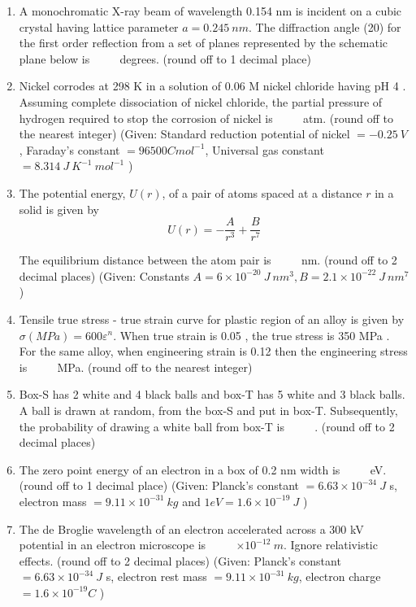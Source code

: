 \documentclass[journal]{IEEEtran}
\begin{document}
\begin{enumerate}
    \item A monochromatic X-ray beam of wavelength 0.154 nm is incident on a cubic crystal having lattice parameter ${a}=0.245 {~nm}$. The diffraction angle (20) for the first order reflection from a set of planes represented by the schematic plane below is $\qquad$ degrees. (round off to 1 decimal place)
    
    \newpage
		

 
    \item Nickel corrodes at 298 K in a solution of 0.06 M nickel chloride having pH 4 . Assuming complete dissociation of nickel chloride, the partial pressure of hydrogen required to stop the corrosion of nickel is $\qquad$ atm. (round off to the nearest integer)
(Given: Standard reduction potential of nickel $=-0.25 {~V}$,
Faraday's constant $=96500 {C} {mol}^{-1}$, Universal gas constant $=8.314 {~J} {~K}^{-1} {~mol}^{-1}$ )
		


    \item The potential energy, ${U}(r)$, of a pair of atoms spaced at a distance $r$ in a solid is given by
$$
{U}(r)=-\frac{A}{r^{3}}+\frac{B}{r^{7}}
$$

The equilibrium distance between the atom pair is $\qquad$ nm.
(round off to 2 decimal places)
(Given: Constants $A=6 \times 10^{-20} {~J} {~nm}^{3}, B=2.1 \times 10^{-22} {~J} {~nm}^{7}$ )

    \item  Tensile true stress - true strain curve for plastic region of an alloy is given by $\sigma({MPa})=600 \varepsilon^{n}$.
When true strain is 0.05 , the true stress is 350 MPa . For the same alloy, when engineering strain is 0.12 then the engineering stress is $\qquad$ MPa. (round off to the nearest integer)


    \item Box-S has 2 white and 4 black balls and box-T has 5 white and 3 black balls. A ball is drawn at random, from the box-S and put in box-T. Subsequently, the probability of drawing a white ball from box-T is $\qquad$ . (round off to 2 decimal places)
    \item The zero point energy of an electron in a box of 0.2 nm width is $\qquad$ eV.
(round off to 1 decimal place)
(Given: Planck's constant $=6.63 \times 10^{-34} {~J}$ s, electron mass $=9.11 \times 10^{-31} {~kg}$ and $1 {eV}=1.6 \times 10^{-19} {~J}$ )

\item The de Broglie wavelength of an electron accelerated across a 300 kV potential in an electron microscope is $\qquad$ $\times 10^{-12} {~m}$. Ignore relativistic effects. (round off to 2 decimal places)
(Given: Planck's constant $=6.63 \times 10^{-34} {~J}$ s, electron rest mass $=9.11 \times 10^{-31} {~kg}$, electron charge $=1.6 \times 10^{-19} {C}$ )
     

\end{enumerate}
\end{document}
